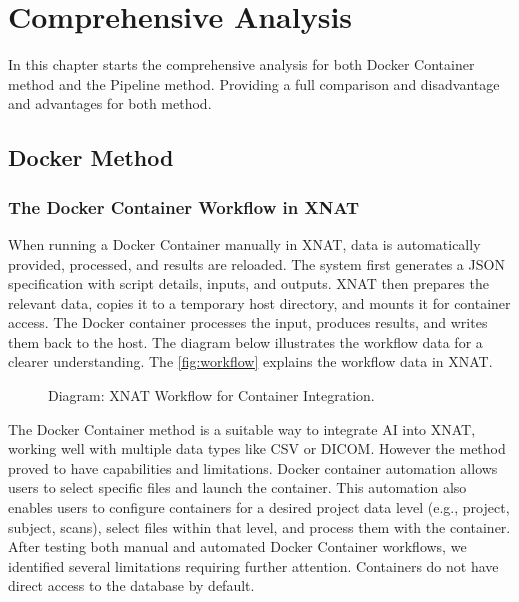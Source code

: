 \chapter{Comprehensive Analysis}
In this chapter starts the comprehensive analysis for both Docker Container method and the Pipeline method. 
Providing a full comparison and disadvantage and advantages for both method.
\section{Docker Method}
\subsection{The Docker Container Workflow in XNAT}

When running a Docker Container manually in XNAT, data is automatically provided, processed, and results are reloaded. The system first generates a JSON specification with script details, inputs, and outputs. XNAT then prepares the relevant data, copies it to a temporary host directory, and mounts it for container access. The Docker container processes the input, produces results, and writes them back to the host.
The diagram below illustrates the workflow data for a clearer understanding.  
The \autoref{fig:workflow} explains the workflow data in XNAT.

\begin{figure}[H]
    \centering
    \def\svgwidth{\linewidth} 
    
    \caption{Diagram: XNAT Workflow for Container Integration.}
    \label{fig:workflow}
\end{figure}



The Docker Container method is a suitable way to integrate AI into XNAT, working well with multiple data types like CSV or DICOM. However the method proved to have capabilities and limitations.
Docker container automation allows users to select specific files and launch the container. This automation also enables users to configure containers for a desired project data level (e.g., project, subject, scans), select files within that level, and process them with the container.
After testing both manual and automated Docker Container workflows, we identified several limitations requiring further attention. 
Containers do not have direct access to the database by default.










